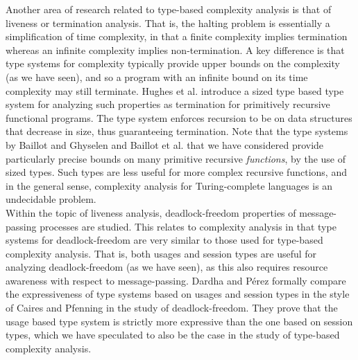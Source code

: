 Another area of research related to type-based complexity analysis is that of liveness or termination analysis. That is, the halting problem is essentially a simplification of time complexity, in that a finite complexity implies termination whereas an infinite complexity implies non-termination. A key difference is that type systems for complexity typically provide upper bounds on the complexity (as we have seen), and so a program with an infinite bound on its time complexity may still terminate. Hughes et al. \cite{HughesEtAl1996} introduce a sized type based type system for analyzing such properties as termination for primitively recursive functional programs. The type system enforces recursion to be on data structures that decrease in size, thus guaranteeing termination. Note that the type systems by Baillot and Ghyselen \cite{BaillotGhyselen2021} and Baillot et al. \cite{BaillotEtAl2021} that we have considered provide particularly precise bounds on many primitive recursive \textit{functions}, by the use of sized types. Such types are less useful for more complex recursive functions, and in the general sense, complexity analysis for Turing-complete languages is an undecidable problem.\\

Within the topic of liveness analysis, deadlock-freedom properties of message-passing processes are studied. This relates to complexity analysis in that type systems for deadlock-freedom are very similar to those used for type-based complexity analysis. That is, both usages and session types are useful for analyzing deadlock-freedom (as we have seen), as this also requires resource awareness with respect to message-passing. Dardha and Pérez \cite{DardhaPerezComparison} formally compare the expressiveness of type systems based on usages and session types in the style of Caires and Pfenning \cite{CairesPfenning2010} in the study of deadlock-freedom. They prove that the usage based type system is strictly more expressive than the one based on session types, which we have speculated to also be the case in the study of type-based complexity analysis. 

